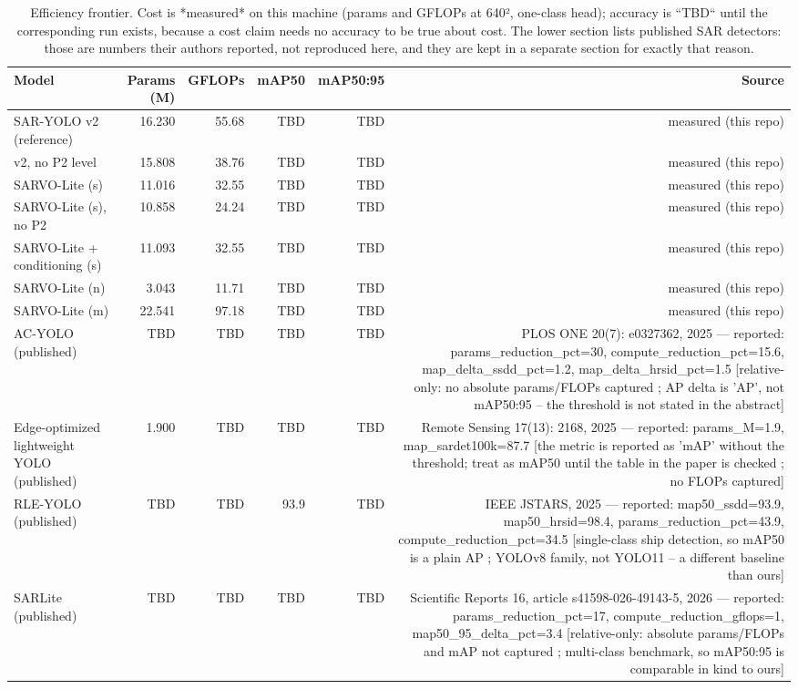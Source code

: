 \begin{table}[t]
\centering
\caption{Efficiency frontier. Cost is *measured* on this machine (params and GFLOPs at 640², one-class head); accuracy is ``TBD`` until the corresponding run exists, because a cost claim needs no accuracy to be true about cost. The lower section lists published SAR detectors: those are numbers their authors reported, not reproduced here, and they are kept in a separate section for exactly that reason.}
\label{tab:efficiency_frontier}
\begin{tabular}{lrrrrr}
\toprule
Model & Params (M) & GFLOPs & mAP50 & mAP50:95 & Source \\
\midrule
SAR-YOLO v2 (reference) & 16.230 & 55.68 & TBD & TBD & measured (this repo) \\
v2, no P2 level & 15.808 & 38.76 & TBD & TBD & measured (this repo) \\
SARVO-Lite (s) & 11.016 & 32.55 & TBD & TBD & measured (this repo) \\
SARVO-Lite (s), no P2 & 10.858 & 24.24 & TBD & TBD & measured (this repo) \\
SARVO-Lite + conditioning (s) & 11.093 & 32.55 & TBD & TBD & measured (this repo) \\
SARVO-Lite (n) & 3.043 & 11.71 & TBD & TBD & measured (this repo) \\
SARVO-Lite (m) & 22.541 & 97.18 & TBD & TBD & measured (this repo) \\
AC-YOLO (published) & TBD & TBD & TBD & TBD & PLOS ONE 20(7): e0327362, 2025 — reported: params_reduction_pct=30, compute_reduction_pct=15.6, map_delta_ssdd_pct=1.2, map_delta_hrsid_pct=1.5 [relative-only: no absolute params/FLOPs captured ; AP delta is 'AP', not mAP50:95 -- the threshold is not stated in the abstract] \\
Edge-optimized lightweight YOLO (published) & 1.900 & TBD & TBD & TBD & Remote Sensing 17(13): 2168, 2025 — reported: params_M=1.9, map_sardet100k=87.7 [the metric is reported as 'mAP' without the threshold; treat as mAP50 until the table in the paper is checked ; no FLOPs captured] \\
RLE-YOLO (published) & TBD & TBD & 93.9 & TBD & IEEE JSTARS, 2025 — reported: map50_ssdd=93.9, map50_hrsid=98.4, params_reduction_pct=43.9, compute_reduction_pct=34.5 [single-class ship detection, so mAP50 is a plain AP ; YOLOv8 family, not YOLO11 -- a different baseline than ours] \\
SARLite (published) & TBD & TBD & TBD & TBD & Scientific Reports 16, article s41598-026-49143-5, 2026 — reported: params_reduction_pct=17, compute_reduction_gflops=1, map50_95_delta_pct=3.4 [relative-only: absolute params/FLOPs and mAP not captured ; multi-class benchmark, so mAP50:95 is comparable in kind to ours] \\
\bottomrule
\end{tabular}
\end{table}

